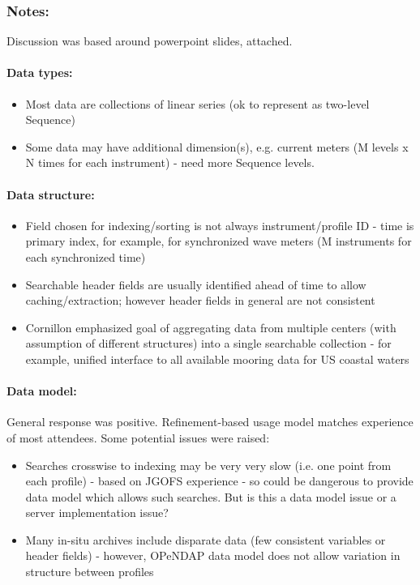 \subsubsection{Notes:}

Discussion was based around powerpoint slides, attached.

\paragraph{Data types:}

\begin{itemize}
\item Most data are collections of linear series (ok to represent as
  two-level Sequence)
\item Some data may have additional dimension(s), e.g. current meters
  (M levels x N times for each instrument) - need more Sequence
  levels.
\end{itemize}

\paragraph{Data structure:}

\begin{itemize}
\item Field chosen for indexing/sorting is not always
  instrument/profile ID - time is primary index, for example, for
  synchronized wave meters (M instruments for each synchronized time)
\item Searchable header fields are usually identified ahead of time to
  allow caching/extraction; however header fields in general are not
  consistent
\item Cornillon emphasized goal of aggregating data from multiple
  centers (with assumption of different structures) into a single
  searchable collection - for example, unified interface to all
  available mooring data for US coastal waters
\end{itemize}

\paragraph{Data model:}

General response was positive. Refinement-based usage model matches
experience of most attendees. Some potential issues were raised:

\begin{itemize}
\item Searches crosswise to indexing may be very very slow (i.e. one
  point from each profile) - based on JGOFS experience - so could be
  dangerous to provide data model which allows such searches. But is
  this a data model issue or a server implementation issue?
\item Many in-situ archives include disparate data (few consistent
  variables or header fields) - however, OPeNDAP data model does not
  allow variation in structure between profiles
\end{itemize}        


